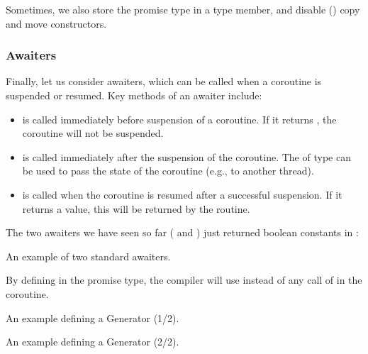 \begin{itemize}
\begin{end}
Sometimes, we also store the promise type in a  type member, and disable () copy and move constructors. 

\subsubsection{Awaiters}

Finally, let us consider awaiters, which can be called when a coroutine is suspended or resumed. 
Key methods of an awaiter include:
\begin{itemize}
\item {} is called immediately before suspension of a coroutine. If it returns , the coroutine will not be suspended. 
\item {} is called immediately after the suspension of the coroutine. The  of type  can be used to pass the state of the coroutine (e.g., to another thread). 
\item {} is called when the coroutine is resumed after a successful suspension. If it returns a value, this will be returned by the  routine. 
\end{itemize}
The two awaiters we have seen so far ( and ) just returned boolean constants in :

\raggedbottom
\begin{codebox}[]{\href{https://godbolt.org/z/sK884T7hh}{\ExternalLink}}
\footnotesize An example of two standard awaiters.
\tcblower
{}
\end{codebox}

By defining  in the promise type, the compiler will use  instead of any call of  in the coroutine. 

\raggedbottom
\begin{codebox}[]{\href{https://godbolt.org/z/b5a94YeKx}{\ExternalLink}}
\footnotesize An example defining a Generator (1/2).
\tcblower
{}
\end{codebox}

\raggedbottom
\begin{codebox}[]{\href{https://godbolt.org/z/b5a94YeKx}{\ExternalLink}}
\footnotesize An example defining a Generator (2/2).
\tcblower
{}
\end{codebox}


\end{end}
\end{itemize}
